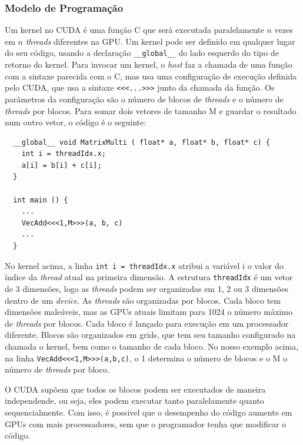 \subsubsection{Modelo de Programação}
Um kernel no CUDA é uma função C que será executada paralelamente $n$ vezes em $n$ \textit{threads} diferentes na GPU. Um kernel pode ser
definido em qualquer lugar do seu código, usando a declaração \verb#__global__# do lado esquerdo do tipo de retorno do kernel.
Para invocar um kernel, o \textit{host} faz a chamada de uma função com a sintaxe parecida com o C, mas usa uma configuração de
execução definida pelo CUDA, que usa a sintaxe \verb#<<<...>>># junto da chamada da função. Os parâmetros da configuração são
o número de blocos de \textit{threads} e o número de \textit{threads} por blocos. Para somar dois vetores de tamanho M e guardar o resultado num
outro vetor, o código é o seguinte:

\begin{lstlisting}
  __global__ void MatrixMulti ( float* a, float* b, float* c) { 
    int i = threadIdx.x;
    a[i] = b[i] + c[i];        
  }
                            
  int main () {               
    ...                       
    VecAdd<<<1,M>>>(a, b, c)  
    ...                       
  }                                 
\end{lstlisting}

No kernel acima, a linha \verb#int i = threadIdx.x# atribui a variável i o valor do índice da \textit{thread} atual na primeira dimensão. 
A estrutura \verb#threadIdx# é um vetor de 3 dimensões, logo as \textit{threads} podem ser organizadas em 1, 2 ou 3 dimensões dentro de um
\textit{device}. As \textit{threads} são organizadas por blocos. Cada bloco tem dimensões maleáveis, mas as GPUs atuais limitam para 1024 o 
número máximo de \textit{threads} por blocos. Cada bloco é lançado para execução em um processador diferente. Blocos são organizados em 
grids, que tem seu tamanho configurado na chamada o kernel, bem como o tamanho de cada bloco. No nosso exemplo acima, na linha
\verb#VecAdd<<<1,M>>>(a,b,c)#, o 1 determina o número de blocos e o M o número de \textit{threads} por bloco.

O CUDA supõem que todos os blocos podem ser executados de maneira independende, ou seja, eles podem executar tanto paralelamente
quanto sequencialmente. Com isso, é possivel que o desempenho do código aumente em GPUs com mais processadores, sem que o programador
tenha que modificar o código.

